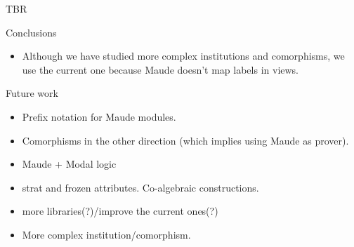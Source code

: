 
TBR

Conclusions
\begin{itemize}
\item Although we have studied more complex institutions and comorphisms,
we use the current one because Maude doesn't map labels in views.
\end{itemize}

Future work
\begin{itemize}
\item Prefix notation for Maude modules.
\item Comorphisms in the other direction (which implies using Maude
as prover).
\item Maude + Modal logic
\item strat and frozen attributes. Co-algebraic constructions.
\item more libraries(?)/improve the current ones(?)
\item More complex institution/comorphism.
\end{itemize}